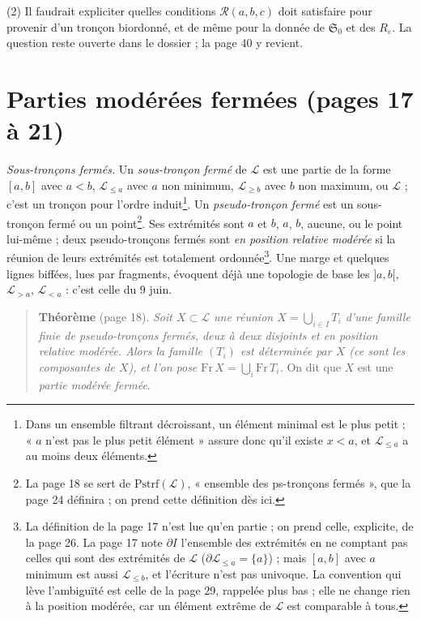 \documentclass[11pt,a4paper]{article}
\begin{document}
(2) Il faudrait expliciter quelles conditions $\mathcal{R}(a,b,c)$ doit
satisfaire pour provenir d'un tronçon biordonné, et de même pour la donnée de
$\mathfrak{S}_{0}$ et des $R_{\varepsilon}$. La question reste ouverte dans le
dossier ; la page 40 y revient.

\section*{Parties modérées fermées (pages 17 à 21)}

\emph{Sous-tronçons fermés.} Un \emph{sous-tronçon fermé} de $\mathcal{L}$ est
une partie de la forme $[a,b]$ avec $a < b$, $\mathcal{L}_{\leq a}$ avec $a$
non minimum, $\mathcal{L}_{\geq b}$ avec $b$ non maximum, ou $\mathcal{L}$ ;
c'est un tronçon pour l'ordre induit\footnote{Dans un ensemble filtrant
décroissant, un élément minimal est le plus petit ; « $a$ n'est pas le plus
petit élément » assure donc qu'il existe $x < a$, et $\mathcal{L}_{\leq a}$ a
au moins deux éléments.}. Un \emph{pseudo-tronçon fermé} est un sous-tronçon
fermé ou un point\footnote{La page 18 se sert de $\mathrm{Pstrf}(\mathcal{L})$,
« ensemble des ps-tronçons fermés », que la page 24 définira ; on prend cette
définition dès ici.}. Ses extrémités sont $a$ et $b$, $a$, $b$, aucune, ou le
point lui-même ; deux pseudo-tronçons fermés sont \emph{en position relative
modérée} si la réunion de leurs extrémités est totalement ordonnée\footnote{La
définition de la page 17 n'est lue qu'en partie ; on prend celle, explicite, de
la page 26. La page 17 note $\partial I$ l'ensemble des extrémités en ne
comptant pas celles qui sont des extrémités de $\mathcal{L}$ ($\partial
\mathcal{L}_{\leq a} = \{a\}$) ; mais $[a,b]$ avec $a$ minimum est aussi
$\mathcal{L}_{\leq b}$, et l'écriture n'est pas univoque. La convention qui
lève l'ambiguïté est celle de la page 29, rappelée plus bas ; elle ne change
rien à la position modérée, car un élément extrême de $\mathcal{L}$ est
comparable à tous.}. Une marge et quelques lignes biffées, lues par fragments,
évoquent déjà une topologie de base les $]a,b[$, $\mathcal{L}_{>a}$,
$\mathcal{L}_{<a}$ : c'est celle du 9 juin.

\begin{quote}
\textbf{Théorème} (page 18). \emph{Soit $X \subset \mathcal{L}$ une réunion
$X = \bigcup_{i \in I} T_{i}$ d'une famille finie de pseudo-tronçons fermés,
deux à deux disjoints et en position relative modérée. Alors la famille
$(T_{i})$ est déterminée par $X$ (ce sont les composantes de $X$), et l'on
pose $\mathrm{Fr}\, X = \bigcup_{i} \mathrm{Fr}\, T_{i}$.} On dit que $X$ est une
\emph{partie modérée fermée}.
\end{quote}
\end{document}
